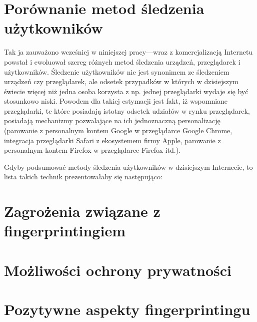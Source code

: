 \section{Porównanie metod śledzenia użytkowników}
Tak ja zauważono wcześniej w niniejszej pracy---wraz z komercjalizacją Internetu
powstał i ewoluował szereg różnych metod śledzenia urządzeń, przeglądarek i
użytkowników. Śledzenie użytkowników nie jest synonimem ze śledzeniem urządzeń
czy przeglądarek, ale odsetek przypadków w których w dzisiejszym świecie więcej
niż jedna osoba korzysta z np. jednej przeglądarki wydaje się być stosunkowo
niski. Powodem dla takiej estymacji jest fakt, iż wspomniane przeglądarki, te
które posiadają istotny odsetek udziałów w rynku przeglądarek, posiadają
mechanizmy pozwalające na ich jednoznaczną personalizację (parowanie z
personalnym kontem Google w przeglądarce Google Chrome, integracja przeglądarki
Safari z ekosystemem firmy Apple, parowanie z personalnym kontem Firefox w
przeglądarce Firefox itd.).

Gdyby podsumować metody śledzenia użytkowników w dzisiejszym Internecie, to
lista takich technik prezentowałaby się następująco:

\section{Zagrożenia związane z fingerprintingiem}

\section{Możliwości ochrony prywatności}

\section{Pozytywne aspekty fingerprintingu}
